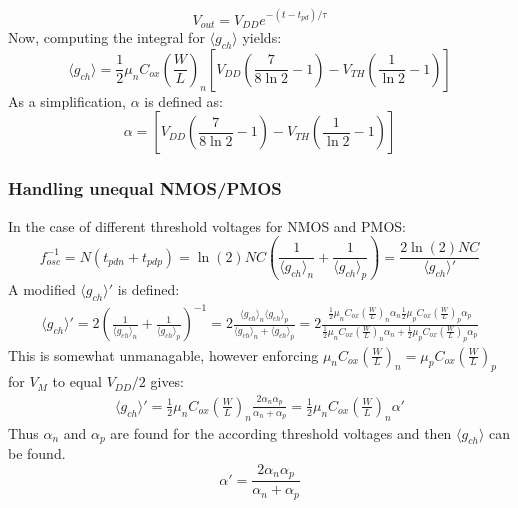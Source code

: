 			\begin{equation}
				V_{out} = V_{DD}e^{-(t-t_{pd})/\tau}
			\end{equation}
			Now, computing the integral for $\langle g_{ch} \rangle$ yields:
			\begin{equation}
				\langle g_{ch} \rangle = \frac{1}{2}\mu_nC_{ox}\left(\frac{W}{L}\right)_n\left[V_{DD}\left(\frac{7}{8\ln2}-1\right)-V_{TH}\left(\frac{1}{\ln2}-1\right) \right]
			\end{equation}
			As a simplification, $\alpha$ is defined as:
			\begin{equation}
				\alpha = \left[V_{DD}\left(\frac{7}{8\ln2}-1\right)-V_{TH}\left(\frac{1}{\ln2}-1\right) \right]
			\end{equation}	
		
		\subsubsection{Handling unequal NMOS/PMOS}
			In the case of different threshold voltages for NMOS and PMOS:
			\begin{equation}
				f_{osc}^{-1} = N(t_{pdn} + t_{pdp}) = \ln(2)NC\left(\frac{1}{\langle g_{ch}\rangle_n} + \frac{1}{\langle g_{ch}\rangle_p}\right) = \frac{2\ln(2)NC}{\langle g_{ch}\rangle'}
			\end{equation}	
			A modified $\langle g_{ch}\rangle'$ is defined:
			\begin{align}
				\langle g_{ch}\rangle' = 2\left(\frac{1}{\langle g_{ch}\rangle_n} + \frac{1}{\langle g_{ch}\rangle_p}\right)^{-1} = 2\frac{\langle g_{ch}\rangle_n \langle g_{ch}\rangle_p}{\langle g_{ch}\rangle_n + \langle g_{ch}\rangle_p}
				= 2\frac{\frac{1}{2}\mu_nC_{ox}\left(\frac{W}{L}\right)_n \alpha_n\frac{1}{2}\mu_pC_{ox}\left(\frac{W}{L}\right)_p \alpha_p}{\frac{1}{2}\mu_nC_{ox}\left(\frac{W}{L}\right)_n\alpha_n + \frac{1}{2}\mu_pC_{ox}\left(\frac{W}{L}\right)_p\alpha_p}
			\end{align}	
			This is somewhat unmanagable, however enforcing $\mu_nC_{ox}\left(\frac{W}{L}\right)_n = \mu_pC_{ox}\left(\frac{W}{L}\right)_p$ for $V_M$ to equal $V_{DD}/2$ gives:
			\begin{align}
				\langle g_{ch}\rangle' = \frac{1}{2}\mu_nC_{ox}\left(\frac{W}{L}\right)_n\frac{2 \alpha_n\alpha_p}{\alpha_n + \alpha_p} = \frac{1}{2}\mu_nC_{ox}\left(\frac{W}{L}\right)_n \alpha'
			\end{align}	
			Thus $\alpha_n$ and $\alpha_p$ are found for the according threshold voltages and then $\langle g_{ch}\rangle$ can be found.
			\begin{equation}
				\alpha' =  \frac{2 \alpha_n\alpha_p}{\alpha_n + \alpha_p}
			\end{equation}

